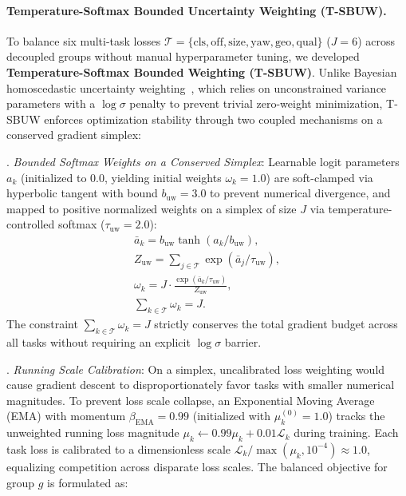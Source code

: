 \paragraph{Temperature-Softmax Bounded Uncertainty Weighting (T-SBUW).}
To balance six multi-task losses $\mathcal{T} = \{\mathrm{cls}, \mathrm{off}, \mathrm{size}, \mathrm{yaw}, \mathrm{geo}, \mathrm{qual}\}$ ($J=6$) across decoupled groups without manual hyperparameter tuning, we developed \textbf{Temperature-Softmax Bounded Weighting (T-SBUW)}. Unlike Bayesian homoscedastic uncertainty weighting~\cite{kendall2018uncertainty}, which relies on unconstrained variance parameters with a $\log \sigma$ penalty to prevent trivial zero-weight minimization, T-SBUW enforces optimization stability through two coupled mechanisms on a conserved gradient simplex:
\par{}. \textit{Bounded Softmax Weights on a Conserved Simplex}: Learnable logit parameters $a_k$ (initialized to $0.0$, yielding initial weights $\omega_k = 1.0$) are soft-clamped via hyperbolic tangent with bound $b_{\mathrm{uw}} = 3.0$ to prevent numerical divergence, and mapped to positive normalized weights on a simplex of size $J$ via temperature-controlled softmax ($\tau_{\mathrm{uw}} = 2.0$):
\begin{equation}
    \begin{gathered}
        \bar{a}_k = b_{\mathrm{uw}} \tanh(a_k / b_{\mathrm{uw}}), \\
        Z_{\mathrm{uw}} = \sum_{j \in \mathcal{T}} \exp(\bar{a}_j / \tau_{\mathrm{uw}}), \\
        \omega_k = J \cdot \frac{\exp(\bar{a}_k / \tau_{\mathrm{uw}})}{Z_{\mathrm{uw}}}, \\
        \sum_{k \in \mathcal{T}} \omega_k = J.
    \end{gathered}
    \label{eq:tsbuw_weights}
\end{equation}
The constraint $\sum_{k \in \mathcal{T}} \omega_k = J$ strictly conserves the total gradient budget across all tasks without requiring an explicit $\log \sigma$ barrier.
\par{}. \textit{Running Scale Calibration}: On a simplex, uncalibrated loss weighting would cause gradient descent to disproportionately favor tasks with smaller numerical magnitudes. To prevent loss scale collapse, an Exponential Moving Average (EMA) with momentum $\beta_{\mathrm{EMA}} = 0.99$ (initialized with $\mu_k^{(0)} = 1.0$) tracks the unweighted running loss magnitude $\mu_k \leftarrow 0.99\mu_k + 0.01\mathcal{L}_k$ during training. Each task loss is calibrated to a dimensionless scale $\mathcal{L}_k / \max(\mu_k, 10^{-4}) \approx 1.0$, equalizing competition across disparate loss scales. The balanced objective for group $g$ is formulated as:
